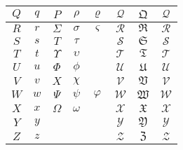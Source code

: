\begin{table}[htb]
\begin{tabular}{|c|c|c|c|c|c|c|c|}
			$Q$ & $q$ & $P$        & $\rho$     & $\varrho$     & $\mathscr{Q}$ & $\mathfrak{Q}$ & $\mathcal{Q}$ \\ \hline
			$R$ & $r$ & $\Sigma$   & $\sigma$   & $\varsigma$   & $\mathscr{R}$ & $\mathfrak{R}$ & $\mathcal{R}$ \\ \hline
			$S$ & $s$ & $T$        & $\tau$     &               & $\mathscr{S}$ & $\mathfrak{S}$ & $\mathcal{S}$ \\ \hline
			$T$ & $t$ & $\Upsilon$ & $\upsilon$ &               & $\mathscr{T}$ & $\mathfrak{T}$ & $\mathcal{T}$ \\ \hline
			$U$ & $u$ & $\Phi$     & $\phi$     &               & $\mathscr{U}$ & $\mathfrak{U}$ & $\mathcal{U}$ \\ \hline
			$V$ & $v$ & $X$        & $\chi$     &               & $\mathscr{V}$ & $\mathfrak{V}$ & $\mathcal{V}$ \\ \hline
			$W$ & $w$ & $\Psi$     & $\psi$     & $\varphi$     & $\mathscr{W}$ & $\mathfrak{W}$ & $\mathcal{W}$ \\ \hline
			$X$ & $x$ & $\Omega$   & $\omega$   &               & $\mathscr{X}$ & $\mathfrak{X}$ & $\mathcal{X}$ \\ \hline
			$Y$ & $y$ &            &            &               & $\mathscr{Y}$ & $\mathfrak{Y}$ & $\mathcal{Y}$ \\ \hline
			$Z$ & $z$ &            &            &               & $\mathscr{Z}$ & $\mathfrak{Z}$ & $\mathcal{Z}$ \\ \hline
		\end{tabular}
		\label{tab:alphabet}
	\end{table}